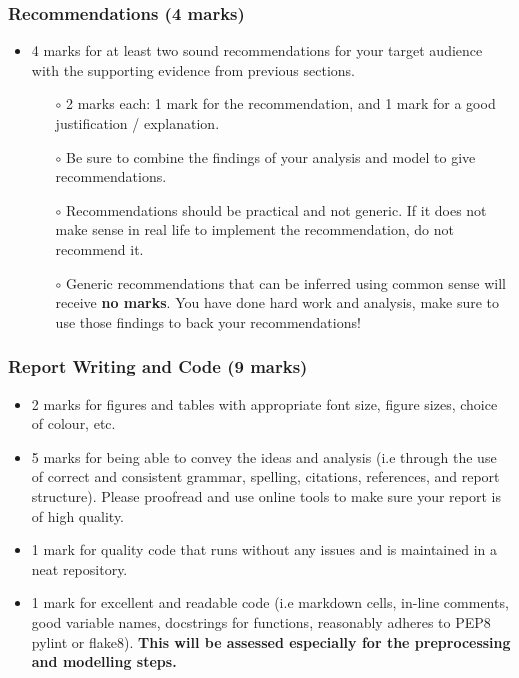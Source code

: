 \documentclass[12pt]{article}
\begin{document}
\subsubsection*{Recommendations (4 marks)}
\begin{itemize}
    \item 4 marks for at least two sound recommendations for your target audience with the supporting evidence from previous sections.
    \begin{itemize}
        \item[$\circ$] 2 marks each: 1 mark for the recommendation, and 1 mark for a good justification / explanation.
        \item[$\circ$] Be sure to combine the findings of your analysis and model to give recommendations.
        \item[$\circ$] Recommendations should be practical and not generic. If it does not make sense in real life to implement the recommendation, do not recommend it.
        \item[$\circ$] Generic recommendations that can be inferred using common sense will receive \textbf{no marks}. You have done hard work and analysis, make sure to use those findings to back your recommendations!
    \end{itemize}
\end{itemize}

\subsubsection*{Report Writing and Code (9 marks)}
\begin{itemize}
    \item 2 marks for figures and tables with appropriate font size, figure sizes, choice of colour, etc.
    \item 5 marks for being able to convey the ideas and analysis (i.e through the use of correct and consistent grammar, spelling, citations, references, and report structure). Please proofread and use online tools to make sure your report is of high quality.
    \item 1 mark for quality code that runs without any issues and is maintained in a neat repository.
    \item 1 mark for excellent and readable code (i.e markdown cells, in-line comments, good variable names, docstrings for functions, reasonably adheres to PEP8 pylint or flake8). \textbf{This will be assessed especially for the preprocessing and modelling steps.}
\end{itemize}
\end{document}
